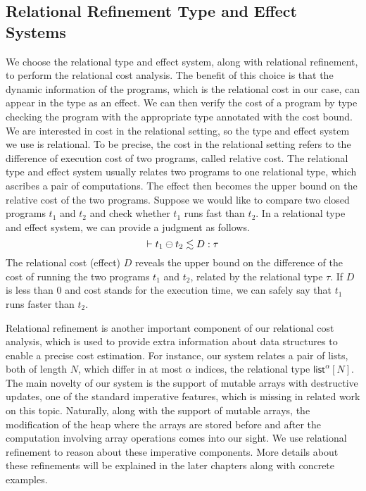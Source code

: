 \subsection{Relational Refinement Type and Effect Systems}
 We choose the relational type and effect system, along with relational refinement, to perform the relational cost analysis. The benefit of this choice is that the dynamic information of the programs, which is the relational cost in our case, can appear in the type as an effect. We can then verify the cost of a program by type checking the program with the appropriate type annotated with the cost bound. We are interested in cost in the relational setting, so the type and effect system we use is relational. To be precise, the cost in the relational setting refers to the difference of execution cost of two programs, called relative cost. The relational type and effect system usually relates two programs to one relational type, which ascribes a pair of computations. The effect then becomes the upper bound on the relative cost of the two programs. Suppose we would like to compare two closed programs $t_1$ and $t_2$ and check whether $t_1$ runs fast than $t_2$. In a relational type and effect system, we can provide a judgment as follows.
\[
   \jtypediff{D}{t_1}{t_2}{\tau} 
\]
The relational cost (effect) $D$ reveals the upper bound on the difference of the cost of running the two programs $t_1$ and $t_2$, related by the relational type $\tau$. If $D$ is less than $0$ and cost stands for the execution time, we can safely say that $t_1$ runs faster than $t_2$.

Relational refinement is another important component of our relational cost analysis, which is used to provide extra information about data structures to enable a precise cost estimation. For instance, our system relates a pair of lists, both of length $N$, which differ in at most $\alpha$ indices, the relational type $\mathsf{list}^{\alpha}[N]$.
The main novelty of our system is the support of mutable arrays with destructive updates, one of the standard imperative features, which is missing in related work on this topic. Naturally, along with the support of mutable arrays, the modification of the heap where the arrays are stored before and after the computation involving array operations comes into our sight. We use relational refinement to reason about these imperative components. 
More details about these refinements will be explained in the later chapters along with concrete examples.

